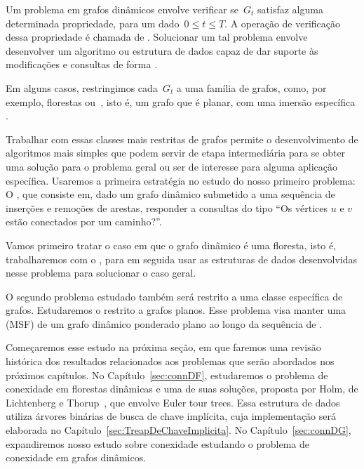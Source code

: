 Um problema em grafos dinâmicos envolve verificar se~$G_t$ satisfaz alguma determinada propriedade, para um dado~$0\leq t\leq T$.
A operação de verificação dessa propriedade é chamada de .
Solucionar um tal problema envolve desenvolver um algoritmo ou estrutura de dados capaz de dar suporte às modificações e consultas de forma .

Em alguns casos, restringimos cada~$G_t$ a uma família de grafos, como, por exemplo, florestas ou~, isto é, um grafo que é planar, com uma imersão específica .

Trabalhar com essas classes mais restritas de grafos permite o desenvolvimento de algoritmos mais simples que podem servir de etapa intermediária para se obter uma solução para o problema geral ou ser de interesse para alguma aplicação específica.
Usaremos a primeira estratégia no estudo do nosso primeiro problema:
O , que consiste em, dado um grafo dinâmico submetido a uma sequência de inserções e remoções de arestas, responder a consultas do tipo “Os vértices $u$ e $v$ estão conectados por um caminho?”.

Vamos primeiro tratar o caso em que o grafo dinâmico é uma floresta, isto é, trabalharemos com o ,
para em seguida usar as estruturas de dados desenvolvidas nesse problema para solucionar o caso geral.

O segundo problema estudado também será restrito a uma classe específica de grafos.
Estudaremos o  restrito a grafos planos.
Esse problema visa manter uma  (MSF) de um grafo dinâmico ponderado plano ao longo da sequência de .

Começaremos esse estudo na próxima seção, em que faremos uma revisão histórica dos resultados relacionados aos problemas que serão abordados nos próximos capítulos.
No Capítulo~\ref{sec:connDF}, estudaremos o problema de conexidade em florestas dinâmicas e uma de suas soluções, proposta por Holm, de Lichtenberg e Thorup~\cite{poly_log}, que envolve Euler tour trees.
Essa estrutura de dados utiliza árvores binárias de busca de chave implícita, cuja implementação será elaborada no Capítulo~\ref{sec:TreapDeChaveImplicita}.
No Capítulo~\ref{sec:connDG}, expandiremos nosso estudo sobre conexidade estudando o problema de conexidade em grafos dinâmicos.

